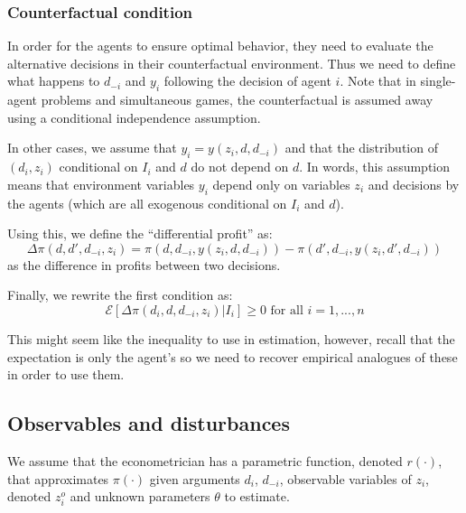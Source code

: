 \subsubsection{Counterfactual condition}

In order for the agents to ensure optimal behavior, they need to evaluate the alternative decisions in their counterfactual environment. Thus we need to define what happens to $d_{-i}$ and $y_i$ following the decision of agent $i$. Note that in single-agent problems and simultaneous games, the counterfactual is assumed away using a conditional independence assumption.

In other cases, we assume that $y_i = y(z_i, d, d_{-i})$ and that the distribution of $(d_i, z_i)$ conditional on $I_i$ and $d$ do not depend on $d$. In words, this assumption means that environment variables $y_i$ depend only on variables $z_i$ and decisions by the agents (which are all exogenous conditional on $I_i$ and $d$).

Using this, we define the ``differential profit'' as: $$\Delta\pi(d, d', d_{-i}, z_i) = \pi(d, d_{-i}, y(z_i, d, d_{-i})) - \pi(d', d_{-i}, y(z_i, d', d_{-i})) $$ as the difference in profits between two decisions.

Finally, we rewrite the first condition as: $$ \mathcal{E}\left[ \Delta\pi(d_i, d, d_{-i}, z_i) | I_i \right] \geq 0  \text{ for all } i = 1, ..., n $$

This might seem like the inequality to use in estimation, however, recall that the expectation is only the agent's so we need to recover empirical analogues of these in order to use them.

\subsection{Observables and disturbances}

We assume that the econometrician has a parametric function, denoted $r(\cdot)$, that approximates $\pi(\cdot)$ given arguments $d_i$, $d_{-i}$,  observable variables of $z_i$, denoted $z_i^o$ and unknown parameters $\theta$ to estimate.

